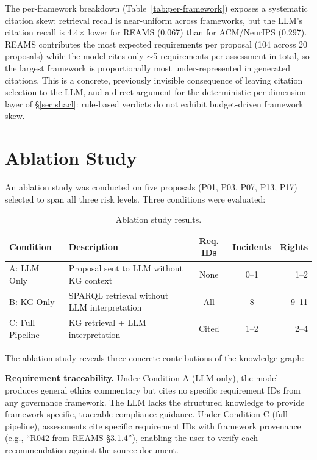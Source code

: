 The per-framework breakdown (Table~\ref{tab:per-framework}) exposes a systematic citation skew: retrieval recall is near-uniform across frameworks, but the LLM's citation recall is 4.4$\times$ lower for REAMS (0.067) than for ACM/NeurIPS (0.297). REAMS contributes the most expected requirements per proposal (104 across 20 proposals) while the model cites only $\sim$5 requirements per assessment in total, so the largest framework is proportionally most under-represented in generated citations. This is a concrete, previously invisible consequence of leaving citation selection to the LLM, and a direct argument for the deterministic per-dimension layer of \S\ref{sec:shacl}: rule-based verdicts do not exhibit budget-driven framework skew.


\section{Ablation Study}
\label{sec:ablation}

An ablation study was conducted on five proposals (P01, P03, P07, P13, P17) selected to span all three risk levels. Three conditions were evaluated:

\begin{table}[htbp]
\centering
\caption{Ablation study results.}
\label{tab:ablation}
\begin{tabular}{p{2.5cm}p{4cm}ccr}
\toprule
\textbf{Condition} & \textbf{Description} & \textbf{Req. IDs} & \textbf{Incidents} & \textbf{Rights} \\
\midrule
A: LLM Only & Proposal sent to LLM without KG context & None & 0--1 & 1--2 \\
B: KG Only & SPARQL retrieval without LLM interpretation & All & 8 & 9--11 \\
C: Full Pipeline & KG retrieval + LLM interpretation & Cited & 1--2 & 2--4 \\
\bottomrule
\end{tabular}
\end{table}

The ablation study reveals three concrete contributions of the knowledge graph:

\textbf{Requirement traceability.} Under Condition A (LLM-only), the model produces general ethics commentary but cites no specific requirement IDs from any governance framework. The LLM lacks the structured knowledge to provide framework-specific, traceable compliance guidance. Under Condition C (full pipeline), assessments cite specific requirement IDs with framework provenance (e.g., ``R042 from REAMS \S 3.1.4''), enabling the user to verify each recommendation against the source document.

